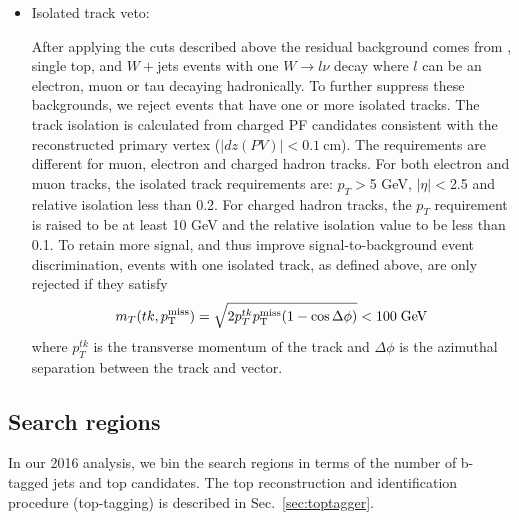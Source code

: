 \begin{itemize}
\item Isolated track veto:

After applying the cuts described above
the residual background comes from
\ttbar, single top, and $W+$jets events with one $W\rightarrow l\nu$
decay where $l$ can be an electron, muon or tau decaying hadronically. 
To further suppress these backgrounds, we reject events 
that have one or more isolated tracks. The track isolation
is calculated from charged PF candidates consistent with the 
reconstructed primary vertex ($|dz(PV)|<0.1~\mathrm{cm}$).
The requirements are different for muon, electron and charged hadron tracks.
For both electron and muon tracks, the isolated track requirements are: 
$p_{T}>$5 GeV, $|\eta|<$2.5 and relative isolation less than 0.2.
For charged hadron tracks, the $p_{T}$ requirement
is raised to be at least 10 GeV and the relative isolation value to be less 
than 0.1. To retain more signal, and thus improve signal-to-background
event discrimination, events with one isolated track, as defined
above, are only rejected if they satisfy
  \begin{equation}
    \label{eq:mt_isotk}
    m_T(tk,p^{\rm miss}_{\rm T}) = \sqrt{2p_{T}^{tk}p^{\rm miss}_{\rm T}(1-\cos\Delta\phi)}<100\;\mathrm{GeV}
  \end{equation}
  where $p_{T}^{tk}$ is the transverse momentum of the track and
  $\Delta\phi$ is the azimuthal separation between the track and \MET
  vector. 

\end{itemize}

\subsection{Search regions}
\label{sec:searchregions}

In our 2016 analysis, we bin the search regions in terms of the number of b-tagged jets and top candidates. 
The top reconstruction and identification procedure (top-tagging) 
is described in Sec.~\ref{sec:toptagger}. 

